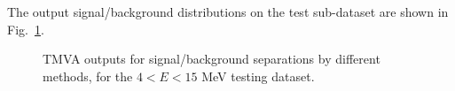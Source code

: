 The output signal/background distributions on the test sub-dataset are shown in Fig.~\ref{output_separation_allE}.
\begin{figure}[htbp]
	\centering
	\caption{TMVA outputs for signal/background separations by different methods, for the $4<E<15$ MeV testing dataset.\label{output_separation_allE}}
\end{figure}

